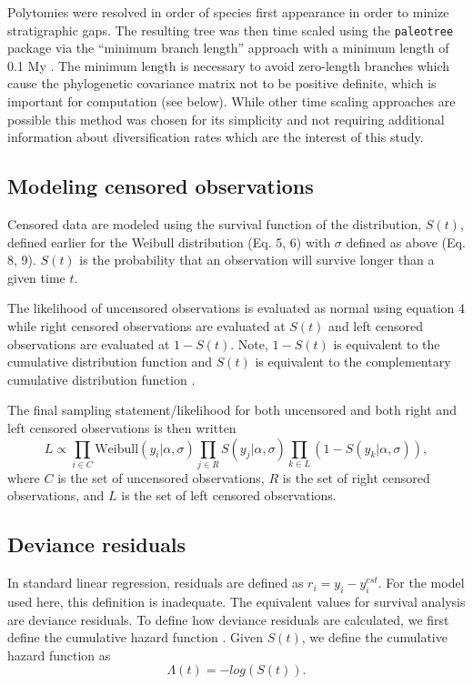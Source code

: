 Polytomies were resolved in order of species first appearance in order to minize stratigraphic gaps. The resulting tree was then time scaled using the \texttt{paleotree} package via the ``minimum branch length'' approach with a minimum length of 0.1 My \cite{Bapst2012a}. The minimum length is necessary to avoid zero-length branches which cause the phylogenetic covariance matrix not to be positive definite, which is important for computation (see below). While other time scaling approaches are possible \cite{Hedman2010,Bapst2013a} this method was chosen for its simplicity and not requiring additional information about diversification rates which are the interest of this study.

\subsection{Modeling censored observations}
Censored data are modeled using the survival function of the distribution, \(S(t)\), defined earlier for the Weibull distribution (Eq. 5, 6) with \(\sigma\) defined as above (Eq. 8, 9). \(S(t)\) is the probability that an observation will survive longer than a given time \(t\). 

The likelihood of uncensored observations is evaluated as normal using equation 4 while right censored observations are evaluated at \(S(t)\) and left censored observations are evaluated at \(1 - S(t)\). Note, \(1 - S(t)\) is equivalent to the cumulative distribution function and \(S(t)\) is equivalent to the complementary cumulative distribution function \cite{Gelman2013d}.

The final sampling statement/likelihood for both uncensored and both right and left censored observations is then written
\begin{equation*}
  L \propto \prod_{i \in C} \mathrm{Weibull}(y_{i} | \alpha, \sigma) \prod_{j \in R} S(y_j | \alpha, \sigma) \prod_{k \in L} \left(1 - S(y_{k} | \alpha, \sigma)\right),
\end{equation*}
where \(C\) is the set of uncensored observations, \(R\) is the set of right censored observations, and \(L\) is the set of left censored observations.

\subsection{Deviance residuals}
In standard linear regression, residuals are defined as \(r_{i} = y_{i} - y_{i}^{est}\). For the model used here, this definition is inadequate. The equivalent values for survival analysis are deviance residuals. To define how deviance residuals are calculated, we first define the cumulative hazard function \cite{Klein2003}. Given \(S(t)\), we define the cumulative hazard function as 
\begin{equation*}
  \Lambda(t) = -log\left(S\left(t\right)\right).
\end{equation*}

